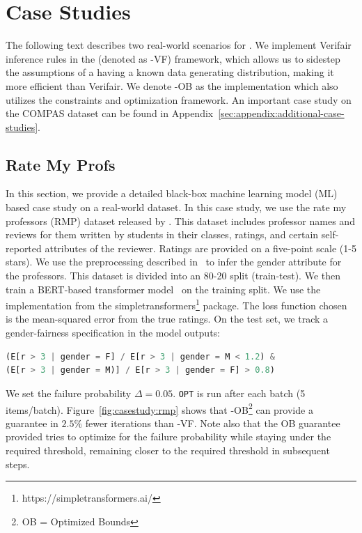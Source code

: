 \section{Case Studies}
\label{sec:casestudy}
The following text describes two real-world scenarios for \AVOIRmethodname{}. 
We implement Verifair inference rules in the \AVOIRmethodname{} (denoted as \AVOIRmethodname{}-VF) framework, which allows us to sidestep the assumptions of a having a known data generating distribution, making it more efficient than Verifair.
We denote \AVOIRmethodname{}-OB as the implementation which also utilizes the constraints and optimization framework.
An important case study on the COMPAS dataset can be found in Appendix~\ref{sec:appendix:additional-case-studies}. 
\subsection{Rate My Profs}
\label{sec:casestudy:rmp}
In this section, we provide a detailed black-box machine learning model (ML) based case study on a real-world dataset.
In this case study, we use the rate my professors (RMP) dataset released by \citet{keymanesh2021fairness}. 
This dataset includes professor names and reviews for them written by students in their classes, ratings, and certain self-reported attributes of the reviewer.
Ratings are provided on a five-point scale (1-5 stars).
We use the preprocessing described in~\citet{keymanesh2021fairness} to infer the gender attribute for the professors.
This dataset is divided into an 80-20 split (train-test).
We then train a BERT-based transformer model~\cite{devlin2019bert} on the training split.
We use the implementation from the simpletransformers\footnote{https://simpletransformers.ai/} package.
The loss function chosen is the mean-squared error from the true ratings.
On the test set, we track a gender-fairness specification in the model outputs:
\begin{lstlisting}[columns=flexible, language=Python]
(E[r > 3 | gender = F] / E[r > 3 | gender = M < 1.2) & 
(E[r > 3 | gender = M)] / E[r > 3 | gender = F] > 0.8)
\end{lstlisting}
We set the failure probability $\Delta = 0.05$. 
\texttt{OPT} is run after each batch (5 items/batch).
Figure~\ref{fig:casestudy:rmp} shows that \AVOIRmethodname{}-OB\footnote{OB = Optimized Bounds} can provide a guarantee in $\mathbf{2.5\%}$ fewer iterations than \AVOIRmethodname{}-VF. 
Note also that the OB guarantee provided tries to optimize for the failure probability while staying under the required threshold, remaining closer to the required threshold in subsequent steps.


